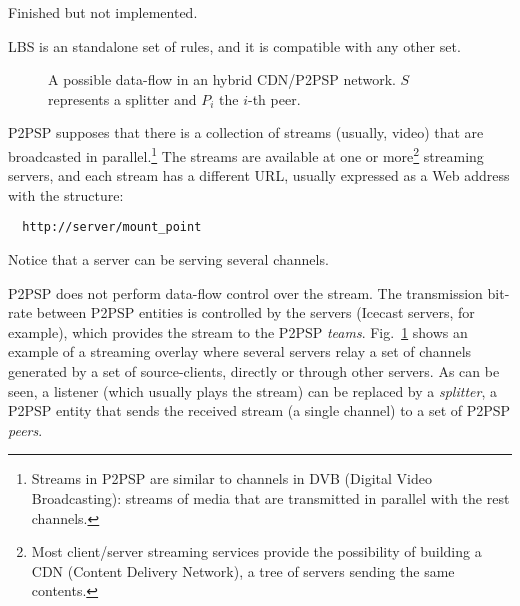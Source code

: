 

\label{sec:LBS}

\begin{note}
  Finished but not implemented.
\end{note}

LBS is an standalone set of rules, and it is compatible with any other
set.

\begin{figure}
  \caption{A possible data-flow in an hybrid CDN/P2PSP
    network. $S$ represents a splitter and $P_i$ the $i$-th
    peer.} %
  \label{fig:icecast-P2PSP}
\end{figure}

P2PSP supposes that there is a collection of \glspl{stream} (usually,
video) that are broadcasted in parallel.\footnote{Streams in P2PSP are
  similar to channels in DVB (Digital Video Broadcasting): streams of
  media that are transmitted in parallel with the rest channels.}  The
\glspl{stream} are available at one or more\footnote{Most
  client/server streaming services provide the possibility of building
  a CDN (Content Delivery Network), a tree of servers sending the same
  contents.} streaming \glspl{server}, and each stream has a different
\acrlong{URL}, usually expressed as a Web address with the structure:
\begin{verbatim}
  http://server/mount_point
\end{verbatim}
Notice that a server can be serving several channels.

P2PSP does not perform data-flow control over the stream. The
transmission bit-rate between P2PSP entities is controlled by the
servers (Icecast servers, for example), which provides the stream to
the P2PSP \emph{teams}. Fig.~\ref{fig:icecast-P2PSP} shows an example
of a streaming overlay where several servers relay a set of channels
generated by a set of source-clients, directly or through other
servers. As can be seen, a listener (which usually plays the stream)
can be replaced by a \emph{splitter}, a P2PSP entity that sends the
received stream (a single channel) to a set of P2PSP \emph{peers}.

